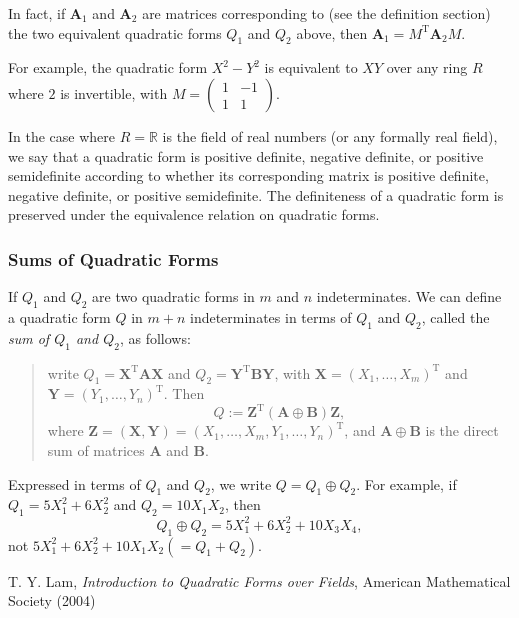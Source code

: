\documentclass[12pt]{article}
\newcommand{\bX}{\mathbf{X}}
\newcommand{\bA}{\mathbf{A}}
\newcommand{\bB}{\mathbf{B}}
\newcommand{\bY}{\mathbf{Y}}
\newcommand{\bZ}{\mathbf{Z}}
\newcommand{\0}{\mathbf{0}}
\begin{document}
In fact, if $\bA_1$ and $\bA_2$ are matrices corresponding to (see the definition section) the two equivalent quadratic forms $Q_1$ and $Q_2$ above, then $\bA_1=M^\mathrm{T}\bA_2M$.

For example, the quadratic form $X^2-Y^2$ is equivalent to $XY$ over any ring $R$ where $2$ is invertible, with $M=\begin{pmatrix} 1 & -1 \\ 1 & 1 \end{pmatrix}$.

In the case where $R=\mathbb{R}$ is the field of real numbers (or any formally real field), we say that a quadratic form is positive definite, negative definite, or positive semidefinite according to whether its corresponding matrix is positive definite, negative definite, or positive semidefinite.  The definiteness of a quadratic form is preserved under the equivalence relation on quadratic forms.

\subsubsection*{Sums of Quadratic Forms}

If $Q_1$ and $Q_2$ are two quadratic forms in $m$ and $n$ indeterminates.  We can define a quadratic form $Q$ in $m+n$ indeterminates in terms of $Q_1$ and $Q_2$, called the \emph{sum of $Q_1$ and $Q_2$}, as follows:
\begin{quote}
write $Q_1={\bX}^{\mathrm{T}} \bA \bX$ and $Q_2={\bY}^{\mathrm{T}} \bB \bY$, with $\bX=(X_1,\ldots,X_m)^{\mathrm{T}}$ and $\bY=(Y_1,\ldots,Y_n)^{\mathrm{T}}$.  Then 
$$Q:={\bZ}^{\mathrm{T}} (\bA\oplus \bB) \bZ,$$ 
where $\bZ=(\bX,\bY)=(X_1,\ldots,X_m,Y_1,\ldots,Y_n)^{\mathrm{T}}$, and $\bA\oplus \bB$ is the direct sum of matrices $\bA$ and $\bB$.
\end{quote}
Expressed in terms of $Q_1$ and $Q_2$, we write $Q=Q_1\oplus Q_2$.  For example, if $Q_1=5X_1^2+6X_2^2$ and $Q_2=10X_1X_2$, then $$Q_1\oplus Q_2=5X_1^2+6X_2^2+10X_3X_4,$$ not $5X_1^2+6X_2^2+10X_1X_2 (=Q_1+Q_2)$.

\begin{thebibliography}{6}
 T. Y. Lam, {\it Introduction to Quadratic Forms over Fields}, American Mathematical Society (2004)
\end{thebibliography}
\end{document}

